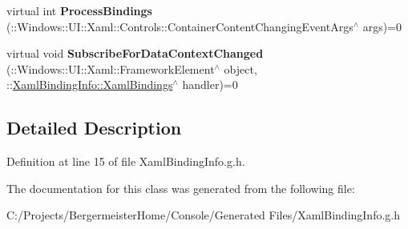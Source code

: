 \begin{DoxyCompactItemize}
virtual int {\bfseries Process\+Bindings} (\+::Windows\+::\+U\+I\+::\+Xaml\+::\+Controls\+::\+Container\+Content\+Changing\+Event\+Args$^\wedge$ args)=0
\item 
\mbox{\label{class_xaml_binding_info_1_1_i_xaml_bindings_a9a6e60fee37d0cf53ccebc9d8c07d90f}} 
virtual void {\bfseries Subscribe\+For\+Data\+Context\+Changed} (\+::Windows\+::\+U\+I\+::\+Xaml\+::\+Framework\+Element$^\wedge$ object, \+::\mbox{\hyperlink{class_xaml_binding_info_1_1_xaml_bindings}{Xaml\+Binding\+Info\+::\+Xaml\+Bindings}}$^\wedge$ handler)=0
\end{DoxyCompactItemize}


\subsection{Detailed Description}


Definition at line 15 of file Xaml\+Binding\+Info.\+g.\+h.



The documentation for this class was generated from the following file\+:\begin{DoxyCompactItemize}
\item 
C\+:/\+Projects/\+Bergermeister\+Home/\+Console/\+Generated Files/Xaml\+Binding\+Info.\+g.\+h\end{DoxyCompactItemize}

